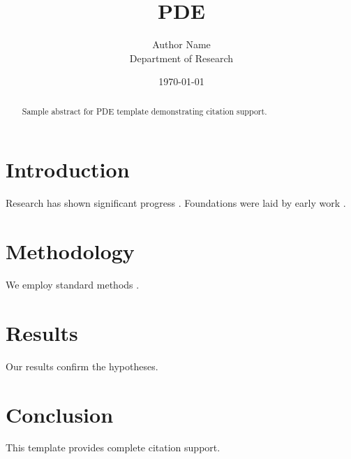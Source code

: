 \documentclass{llncs}
\title{PDE}
\author{Author Name \\ \small Department of Research}
\date{\today}
\begin{document}
\maketitle

\begin{abstract}
Sample abstract for PDE template demonstrating citation support.
\end{abstract}

\section{Introduction}
Research has shown significant progress \citep{einstein1905}. Foundations were laid by early work \citep{turing1950}.

\section{Methodology}
We employ standard methods \citep{knuth1984}.

\section{Results}
Our results confirm the hypotheses.

\section{Conclusion}
This template provides complete citation support.



\end{document}
